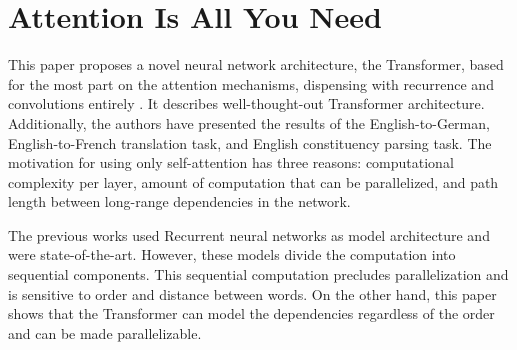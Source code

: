 \documentclass[times, utf8, seminar]{fer}
\begin{document}
\chapter{Attention Is All You Need \citep{vaswani2017attention}}
This paper proposes a novel neural network architecture, the Transformer,
based for the most part on the attention mechanisms, dispensing with recurrence and convolutions entirely \citep{vaswani2017attention}. It describes well-thought-out Transformer architecture. Additionally, the authors have presented the results of the English-to-German, English-to-French translation task, and English constituency parsing task. The motivation for using only self-attention has three reasons: computational complexity per layer, amount of computation that can be parallelized, and path length between long-range dependencies in the network.


The previous works used Recurrent neural networks \citep{chung2014empirical, bahdanau2014neural} as model architecture and were state-of-the-art. However, these models divide the computation into sequential components. This sequential computation precludes parallelization and is sensitive to order and distance between words. On the other hand, this paper shows that the Transformer can model the dependencies regardless of the order and can be made parallelizable.
\end{document}
